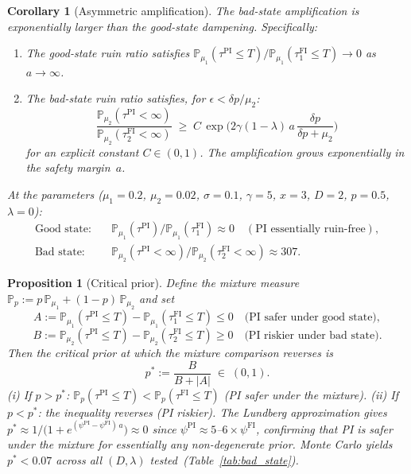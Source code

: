\documentclass[12pt]{article}
\newtheorem{proposition}[theorem]{Proposition}
\newtheorem{corollary}[theorem]{Corollary}
\theoremstyle{remark}
\theoremstyle{definition}
\newcommand{\Prob}{\mathbb{P}}
\newcommand{\FI}{\mathrm{FI}}
\newcommand{\PI}{\mathrm{PI}}
\begin{document}
\begin{corollary}[Asymmetric amplification]
\label{cor:asymmetric}
The bad-state amplification is exponentially larger than the good-state
dampening.
Specifically:
\begin{enumerate}[label=(\roman*)]
\item The good-state ruin ratio satisfies
  $\Prob_{\mu_1}(\tau^{\PI} \le T)\big/
   \Prob_{\mu_1}(\tau_1^{\FI} \le T) \to 0$
  as $a \to \infty$.
\item The bad-state ruin ratio satisfies, for $\epsilon < \delta p/\mu_2$:
  \begin{equation}\label{eq:bad_ratio_bound}
    \frac{\Prob_{\mu_2}(\tau^{\PI} < \infty)}
         {\Prob_{\mu_2}(\tau_2^{\FI} < \infty)}
    \;\ge\;
    C\,\exp\!\biggl(2\gamma(1-\lambda)\,a\,
      \frac{\delta p}{\delta p + \mu_2}\biggr)
  \end{equation}
  for an explicit constant $C \in (0,1)$.
  The amplification grows exponentially in the safety margin~$a$.
\end{enumerate}
At the \citeauthor{HuangSun2025} parameters
($\mu_1 = 0.2$, $\mu_2 = 0.02$, $\sigma = 0.1$, $\gamma = 5$,
$x = 3$, $D = 2$, $p = 0.5$, $\lambda = 0$):
\begin{align*}
  \text{Good state:} \quad
  & \Prob_{\mu_1}(\tau^{\PI})/\Prob_{\mu_1}(\tau_1^{\FI})
    \approx 0 \quad (\text{PI essentially ruin-free}), \\
  \text{Bad state:} \quad
  & \Prob_{\mu_2}(\tau^{\PI} < \infty)/\Prob_{\mu_2}(\tau_2^{\FI} < \infty)
    \approx 307.
\end{align*}
\end{corollary}

\begin{proposition}[Critical prior]\label{prop:critical_prior}
Define the mixture measure $\Prob_p := p\,\Prob_{\mu_1} + (1-p)\,\Prob_{\mu_2}$
and set
\[
  A := \Prob_{\mu_1}(\tau^{\PI} \le T) - \Prob_{\mu_1}(\tau_1^{\FI} \le T) \le 0
  \quad\text{(PI safer under good state)},
\]
\[
  B := \Prob_{\mu_2}(\tau^{\PI} \le T) - \Prob_{\mu_2}(\tau_2^{\FI} \le T) \ge 0
  \quad\text{(PI riskier under bad state)}.
\]
Then the critical prior at which the mixture comparison reverses is
\begin{equation}\label{eq:critical_prior}
  p^* := \frac{B}{B + |A|} \;\in\; (0,1).
\end{equation}
\textup{(i)} If $p > p^*$: $\Prob_p(\tau^{\PI} \le T) < \Prob_p(\tau^{\FI} \le T)$
  \textup{(PI safer under the mixture)}.
\textup{(ii)} If $p < p^*$: the inequality reverses \textup{(PI riskier)}.
The Lundberg approximation gives
$p^* \approx 1/\bigl(1 + e^{(\psi^{\PI} - \psi^{\FI})\,a}\bigr) \approx 0$
since $\psi^{\PI} \approx 5$--$6\times\psi^{\FI}$,
confirming that PI is safer under the mixture for essentially any non-degenerate prior.
Monte Carlo yields $p^* < 0.07$ across all $(D,\lambda)$ tested~\textup{(}Table~\ref{tab:bad_state}\textup{)}.
\end{proposition}
\end{document}

